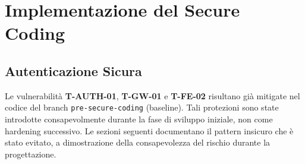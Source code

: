 ﻿\documentclass[a4paper,12pt]{report}
\newcommand{\vuln}[3]{%
  \subsubsection{#1 \hfill \textcolor{vulnred}{\small [#2 — #3]}}%
}
\newcommand{\commitref}[2]{\texttt{\small \href{https://github.com/diegoandruccioli/hotel-pms/commit/#1}{#2}}}
\begin{document}
\chapter{Implementazione del Secure Coding}
\label{ch:storico}

\section{Autenticazione Sicura}

%
%
%
%
%
%

\begin{notebox}[title={Mitigazioni presenti nella baseline (branch \texttt{pre-secure-coding})}]
Le vulnerabilità \textbf{T-AUTH-01}, \textbf{T-GW-01} e \textbf{T-FE-02} risultano già
mitigate nel codice del branch \texttt{pre-secure-coding} (baseline). Tali protezioni sono state introdotte
consapevolmente durante la fase di sviluppo iniziale, non come hardening successivo.
Le sezioni seguenti documentano il pattern insicuro che è stato evitato, a dimostrazione
della consapevolezza del rischio durante la progettazione.
\end{notebox}
\end{document}

